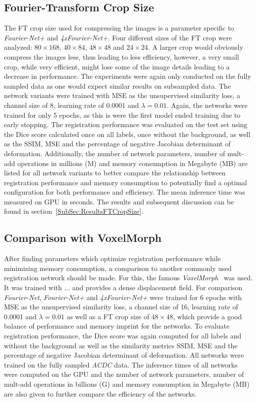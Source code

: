 \documentclass[english,version-2022-01]{uzl-thesis} %
\begin{document}
\subsection{Fourier-Transform Crop Size} \label{SubSec:FTCropSize}
The FT crop size used for compressing the images is a parameter specific to \emph{Fourier-Net+} and \emph{4xFourier-Net+}. Four different sizes of the FT crop were analyzed: $80 \times 168$, $40 \times 84$, $48 \times 48$ and $24 \times 24$. A larger crop would obviously compress the images less, thus leading to less efficiency, however, a very small crop, while very efficient, might lose some of the image details leading to a decrease in performance. The experiments were again only conducted on the fully sampled data as one would expect similar results on subsampled data. The network variants were trained with MSE as the unsupervised similarity loss, a channel size of 8, learning rate of 0.0001 and $\lambda=0.01$. Again, the networks were trained for only 5 epochs, as this is were the first model ended training due to early stopping. The registration performance was evaluated on the test set using the Dice score calculated once on all labels, once without the background, as well as the SSIM, MSE and the percentage of negative Jacobian determinant of deformation. Additionally, the number of network parameters, number of mult-add operations in millions (M) and memory consumption in Megabyte (MB) are listed for all network variants to better compare the relationship between registration performance and memory consumption to potentially find a optimal configuration for both performance and efficiency. The mean inference time was measured on GPU in seconds. The results and subsequent discussion can be found in section~\ref{SubSec:ResultsFTCropSize}.


\subsection{Comparison with VoxelMorph} \label{SubSec:ComparisonVoxelMorph}
After finding parameters which optimize registration performance while minimizing memory consumption, a comparison to another commonly used registration network should be made. For this, the famous \emph{VoxelMorph}~\cite{Voxelmorph} was used. It was trained with ... and provides a dense displacement field. For comparison \emph{Fourier-Net}, \emph{Fourier-Net+} and \emph{4xFourier-Net+} were trained for 6 epochs with MSE as the unsupervised similarity loss, a channel size of 16, learning rate of 0.0001 and $\lambda=0.01$ as well as a FT crop size of $48 \times 48$, which provide a good balance of performance and memory imprint for the networks. To evaluate registration performance, the Dice score was again computed for all labels and without the background as well as the similarity metrics SSIM, MSE and the percentage of negative Jacobian determinant of deformation. All networks were trained on the fully sampled \emph{ACDC} data. The inference times of all networks were computed on the GPU and the number of network parameters, number of mult-add operations in billions (G) and memory consumption in Megabyte (MB) are also given to further compare the efficiency of the networks. 
\end{document}
